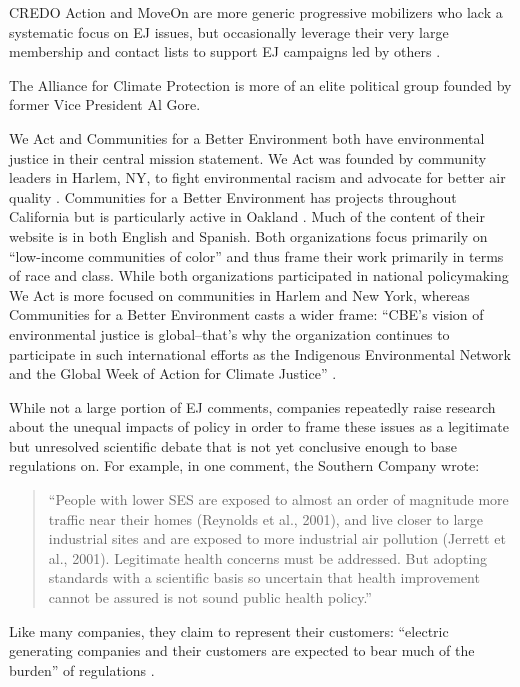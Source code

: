 \documentclass[
      12pt,
        ]{article}
\begin{document}
CREDO Action and MoveOn are more generic progressive
mobilizers who lack a systematic focus on EJ issues,
but occasionally leverage their very large membership and contact lists to support
EJ campaigns led by others
\citep{MoveOn.org2017, CREDO2017}.

The Alliance for Climate Protection is more of an elite political group founded by former Vice President Al Gore.

We Act and Communities for a Better Environment both have environmental
justice in their central mission statement. We Act was founded by
community leaders in Harlem, NY, to fight environmental racism and
advocate for better air quality \citep{WEACT2017}. Communities for a Better Environment has projects throughout California but is particularly
active in Oakland \citep{CBECAL2017}. Much of the
content of their website is in both English and Spanish. Both
organizations focus primarily on ``low-income communities of color'' and
thus frame their work primarily in terms of race and class. While both
organizations participated in national policymaking We Act is more
focused on communities in Harlem and New York, whereas Communities for a
Better Environment casts a wider frame: ``CBE's vision of environmental
justice is global--that's why the organization continues to participate
in such international efforts as the Indigenous Environmental Network
and the Global Week of Action for Climate Justice'' \citep{CBECAL2017}.

While not a large portion of EJ comments, companies repeatedly raise research about the unequal impacts of policy in order to frame these issues as a legitimate but unresolved scientific debate that is not yet conclusive enough to base regulations
on. For example, in one comment, the Southern Company wrote:

\begin{quote}
``People with lower SES are exposed to almost an order of magnitude
more traffic near their homes (Reynolds et al., 2001), and live closer
to large industrial sites and are exposed to more industrial air
pollution (Jerrett et al., 2001). Legitimate health concerns must be
addressed. But adopting standards with a scientific basis so uncertain
that health improvement cannot be assured is not sound public health
policy.''
\end{quote}

Like many companies, they claim to represent their customers:
``electric generating companies and their customers are expected to bear
much of the burden'' of regulations \citep{Hobson2004}.
\end{document}
